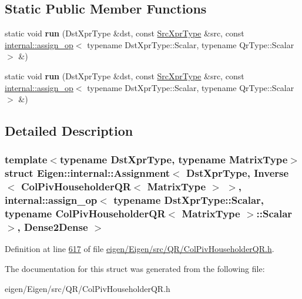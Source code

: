 \subsection*{Static Public Member Functions}
\begin{DoxyCompactItemize}
\item 
\mbox{\label{struct_eigen_1_1internal_1_1_assignment_3_01_dst_xpr_type_00_01_inverse_3_01_col_piv_householdera738c212c6cb5ba27ad8c50c6864d6b5_abd58dc876e3e7da378577a72fb5ffa06}} 
static void {\bfseries run} (Dst\+Xpr\+Type \&dst, const \hyperlink{class_eigen_1_1_inverse}{Src\+Xpr\+Type} \&src, const \hyperlink{struct_eigen_1_1internal_1_1assign__op}{internal\+::assign\+\_\+op}$<$ typename Dst\+Xpr\+Type\+::\+Scalar, typename Qr\+Type\+::\+Scalar $>$ \&)
\item 
\mbox{\label{struct_eigen_1_1internal_1_1_assignment_3_01_dst_xpr_type_00_01_inverse_3_01_col_piv_householdera738c212c6cb5ba27ad8c50c6864d6b5_abd58dc876e3e7da378577a72fb5ffa06}} 
static void {\bfseries run} (Dst\+Xpr\+Type \&dst, const \hyperlink{class_eigen_1_1_inverse}{Src\+Xpr\+Type} \&src, const \hyperlink{struct_eigen_1_1internal_1_1assign__op}{internal\+::assign\+\_\+op}$<$ typename Dst\+Xpr\+Type\+::\+Scalar, typename Qr\+Type\+::\+Scalar $>$ \&)
\end{DoxyCompactItemize}


\subsection{Detailed Description}
\subsubsection*{template$<$typename Dst\+Xpr\+Type, typename Matrix\+Type$>$\newline
struct Eigen\+::internal\+::\+Assignment$<$ Dst\+Xpr\+Type, Inverse$<$ Col\+Piv\+Householder\+Q\+R$<$ Matrix\+Type $>$ $>$, internal\+::assign\+\_\+op$<$ typename Dst\+Xpr\+Type\+::\+Scalar, typename Col\+Piv\+Householder\+Q\+R$<$ Matrix\+Type $>$\+::\+Scalar $>$, Dense2\+Dense $>$}



Definition at line \hyperlink{eigen_2_eigen_2src_2_q_r_2_col_piv_householder_q_r_8h_source_l00617}{617} of file \hyperlink{eigen_2_eigen_2src_2_q_r_2_col_piv_householder_q_r_8h_source}{eigen/\+Eigen/src/\+Q\+R/\+Col\+Piv\+Householder\+Q\+R.\+h}.



The documentation for this struct was generated from the following file\+:\begin{DoxyCompactItemize}
\item 
eigen/\+Eigen/src/\+Q\+R/\+Col\+Piv\+Householder\+Q\+R.\+h\end{DoxyCompactItemize}
